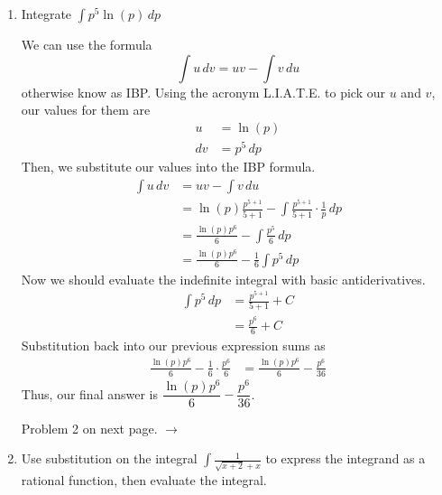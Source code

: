 \documentclass{article}
\begin{document}
\begin{enumerate}[label=\textbf{(4.\arabic*)}]


\item Integrate $\displaystyle{ \int\!p^5\ln(p)\,dp }$

We can use the formula
\[\int\!u\,dv=uv-\int\!v\,du\]
otherwise know as IBP. Using the acronym L.I.A.T.E. to pick our $u$ and $v$, our values for them are
\begin{align*}
u&=\ln(p) \\
dv &= p^5\,dp
\end{align*}
Then, we substitute our values into the IBP formula.
\begin{align*}
\int\!u\,dv &= uv-\int\!v\,du \\
&=\ln(p)\frac{p^{5+1}}{5+1}-\int\!\frac{p^{5+1}}{5+1}\cdot\frac{1}{p}\,dp \\
&=\frac{\ln(p)p^6}{6}-\int\!\frac{p^5}{6}\,dp \\
&=\frac{\ln(p)p^6}{6}-\frac{1}{6}\int\!p^5\,dp
\end{align*}
Now we should evaluate the indefinite integral with basic antiderivatives.
\begin{align*}
    \int\!p^5\,dp &= \frac{p^{5+1}}{5+1}+C \\
    &=\frac{p^6}{6}+C
\end{align*}
Substitution back into our previous expression sums as
\begin{align*}
    \frac{\ln(p)p^6}{6}-\frac{1}{6}\cdot\frac{p^6}{6}&=\frac{\ln(p)p^6}{6}-\frac{p^6}{36}
\end{align*}
Thus, our final answer is $\dfrac{\ln(p)p^6}{6}-\dfrac{p^6}{36}$.
\newline
\begin{center}
Problem 2 on next page. $\rightarrow$	
\end{center}


\newpage %


\item Use substitution on the integral $\displaystyle{\int\!\frac{1}{\sqrt{x+2}+x}}$ to express the integrand as a rational function, then evaluate the integral.


\end{enumerate}
\end{document}
